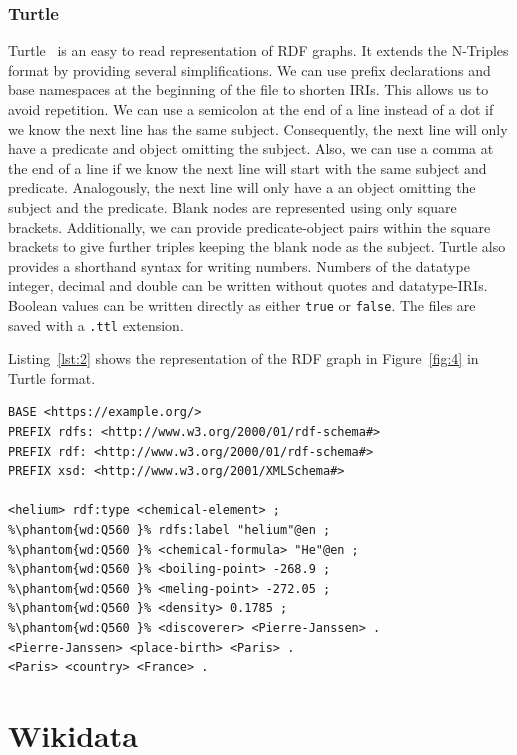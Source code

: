 \subsubsection*{Turtle}
\label{subsubsec:turtle}
Turtle~\cite{D.Beckett} is an easy to read representation of RDF graphs. It extends the N-Triples format by providing several simplifications. We can use prefix declarations and base namespaces at the beginning of the file to shorten IRIs. This allows us to avoid repetition. We can use a semicolon at the end of a line instead of a dot if we know the next line has the same subject. Consequently, the next line will only have a predicate and object omitting the subject. Also, we can use a comma at the end of a line if we know the next line will start with the same subject and predicate. Analogously, the next line will only have a an object omitting the subject and the predicate. Blank nodes are represented using only square brackets. Additionally, we can provide predicate-object pairs within the square brackets to give further triples keeping the blank node as the subject. Turtle also provides a shorthand syntax for writing numbers. Numbers of the datatype integer, decimal and double can be written without quotes and datatype-IRIs. Boolean values can be written directly as either \texttt{true} or \texttt{false}. The files are saved with a \texttt{.ttl} extension.

Listing~\ref{lst:2} shows the representation of the RDF graph in Figure~\ref{fig:4} in Turtle format. 

\begin{minipage}{\linewidth}
\begin{lstlisting}[label=lst:2, columns=fullflexible, caption={RDF graph represented in Turtle syntax}, language=SPARQL]
BASE <https://example.org/>
PREFIX rdfs: <http://www.w3.org/2000/01/rdf-schema#>
PREFIX rdf: <http://www.w3.org/2000/01/rdf-schema#>
PREFIX xsd: <http://www.w3.org/2001/XMLSchema#>

<helium> rdf:type <chemical-element> ;
%\phantom{wd:Q560 }% rdfs:label "helium"@en ;
%\phantom{wd:Q560 }% <chemical-formula> "He"@en ;
%\phantom{wd:Q560 }% <boiling-point> -268.9 ;
%\phantom{wd:Q560 }% <meling-point> -272.05 ;
%\phantom{wd:Q560 }% <density> 0.1785 ;
%\phantom{wd:Q560 }% <discoverer> <Pierre-Janssen> .
<Pierre-Janssen> <place-birth> <Paris> .
<Paris> <country> <France> .
\end{lstlisting}
\end{minipage}


\section{Wikidata}

